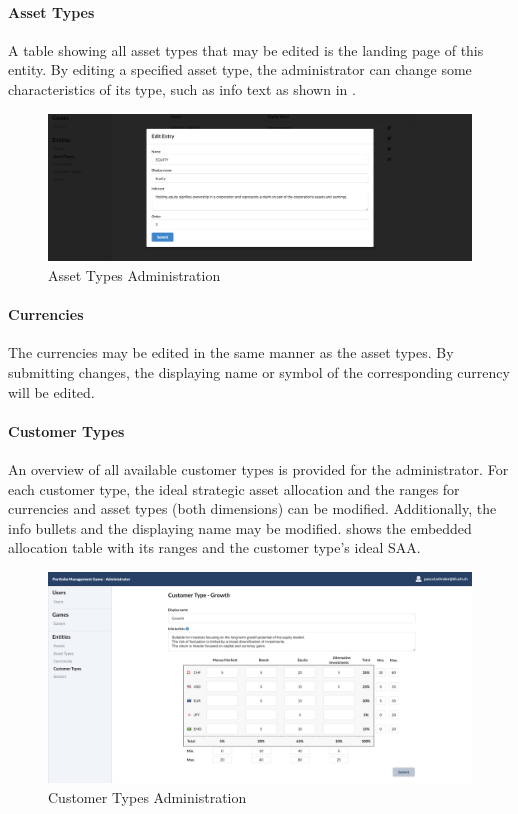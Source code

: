 \paragraph{Asset Types}
A table showing all asset types that may be edited is the landing page of this entity. By editing a specified asset type, the administrator can change some characteristics of its type, such as info text as shown in .
\begin{figure}[h!]
  \centering
  \includegraphics[scale=0.2]{img/application-overview/administrator/entities_asset_types.png}
  \caption{Asset Types Administration}
  \label{fig:asset_types}
\end{figure}

\paragraph{Currencies}
The currencies may be edited in the same manner as the asset types. By submitting changes, the displaying name or symbol of the corresponding currency will be edited.

\paragraph{Customer Types}
An overview of all available customer types is provided for the administrator. For each customer type, the ideal strategic asset allocation and the ranges for currencies and asset types (both dimensions) can be modified. Additionally, the info bullets and the displaying name may be modified.  shows the embedded allocation table with its ranges and the customer type's ideal SAA.

\begin{figure}[h!]
  \centering
  \includegraphics[scale=0.2]{img/application-overview/administrator/entities_customer_types.png}
  \caption{Customer Types Administration}
  \label{fig:customer_types}
\end{figure}

